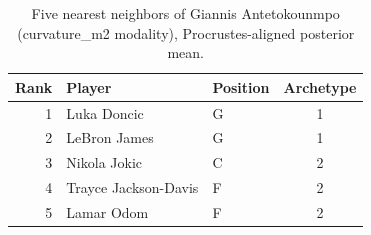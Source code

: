 \begin{table}[htbp]
  \centering\small
  \begin{tabular}{rllc}
    \toprule
    Rank & Player & Position & Archetype \\
    \midrule
    1 & Luka Doncic & G & 1 \\
    2 & LeBron James & G & 1 \\
    3 & Nikola Jokic & C & 2 \\
    4 & Trayce Jackson-Davis & F & 2 \\
    5 & Lamar Odom & F & 2 \\
    \bottomrule
  \end{tabular}
  \caption{Five nearest neighbors of Giannis Antetokounmpo (curvature_m2 modality), Procrustes-aligned posterior mean.}
  \label{tab:Giannis_Antetokounmpo_neighbors_curvature_m2}
\end{table}

